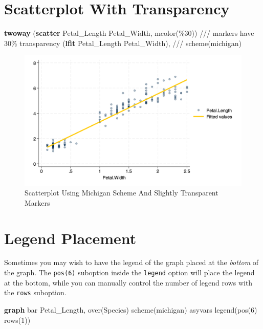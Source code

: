 \documentclass[
  letterpaper,
  DIV=11,
  numbers=noendperiod]{scrartcl}
\newenvironment{Shaded}{\begin{snugshade}}{\end{snugshade}}
\newcommand{\BaseNTok}[1]{\textcolor[rgb]{0.68,0.00,0.00}{#1}}
\newcommand{\CommentTok}[1]{\textcolor[rgb]{0.37,0.37,0.37}{#1}}
\newcommand{\DecValTok}[1]{\textcolor[rgb]{0.68,0.00,0.00}{#1}}
\newcommand{\KeywordTok}[1]{\textcolor[rgb]{0.00,0.23,0.31}{\textbf{#1}}}
\newcommand{\NormalTok}[1]{\textcolor[rgb]{0.00,0.23,0.31}{#1}}
\begin{document}
\section{Scatterplot With
Transparency}\label{scatterplot-with-transparency}

\begin{Shaded}
\begin{Highlighting}[]
\KeywordTok{twoway}\NormalTok{ (}\KeywordTok{scatter}\NormalTok{ Petal\_Length Petal\_Width, mcolor(\%30)) }\CommentTok{/// markers have 30\% transparency}
\NormalTok{(}\KeywordTok{lfit}\NormalTok{ Petal\_Length Petal\_Width), }\CommentTok{///}
\DecValTok{scheme}\NormalTok{(michigan)}
\end{Highlighting}
\end{Shaded}

\begin{figure}[H]

{\centering \includegraphics[width=0.5\linewidth,height=\textheight,keepaspectratio]{myscatter2.png}

}

\caption{Scatterplot Using Michigan Scheme And Slightly Transparent
Markers}

\end{figure}%

\section{Legend Placement}\label{legend-placement}

Sometimes you may wish to have the legend of the graph placed at the
\emph{bottom} of the graph. The \texttt{pos(6)} suboption inside the
\texttt{legend} option will place the legend at the bottom, while you
can manually control the number of legend rows with the \texttt{rows}
suboption.

\begin{Shaded}
\begin{Highlighting}[]
\KeywordTok{graph} \BaseNTok{bar}\NormalTok{ Petal\_Length, }\BaseNTok{over}\NormalTok{(Species) }\DecValTok{scheme}\NormalTok{(michigan) asyvars }\BaseNTok{legend}\NormalTok{(pos(6) }\BaseNTok{rows}\NormalTok{(1))}
\end{Highlighting}
\end{Shaded}
\end{document}
